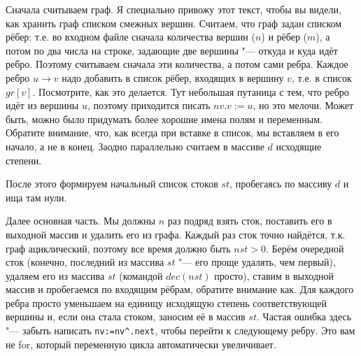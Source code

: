 Сначала считываем граф. Я специально привожу этот текст, чтобы вы видели, как хранить граф списком смежных вершин.
Считаем, что граф задан списком рёбер: т.е. во входном файле сначала количества вершин ($n$) и рёбер ($m$), а потом 
по два числа на строке, задающие две вершины "--- откуда и куда идёт ребро. Поэтому считываем сначала эти количества,
а потом сами ребра. Каждое ребро $u\to v$ надо добавить в список рёбер, входящих в вершину $v$, т.е. в список $gr[v]$.
Посмотрите, как это делается. Тут небольшая путаница с тем, что ребро идёт из вершины $u$, поэтому приходится
писать $nv.v:=u$, но это мелочи. Может быть, можно было придумать более хорошие имена полям и переменным. Обратите
внимание, что, как всегда при вставке в список, мы вставляем в его начало, а не в конец. Заодно параллельно
считаем в массиве $d$ исходящие степени.

После этого формируем начальный список стоков $st$, пробегаясь по массиву $d$ и ища там нули. 

Далее основная часть. Мы должны $n$ раз подряд взять сток, поставить его в выходной массив и удалить его из графа.
Каждый раз сток точно найдётся, т.к. граф ациклический, поэтому все время должно быть $nst>0$. Берём очередной сток
(конечно, последний из массива $st$ "--- его проще удалять, чем первый), удаляем его из массива $st$ (командой
$dec(nst)$ просто), ставим в выходной массив и пробегаемся по входящим рёбрам, обратите внимание как. Для каждого
ребра просто уменьшаем на единицу исходящую степень соответствующей вершины и, если она стала стоком, заносим её
в массив $st$. Частая ошибка здесь "--- забыть написать \verb'nv:=nv^.next', чтобы перейти к следующему ребру. Это вам не
for, который переменную цикла автоматически увеличивает.




